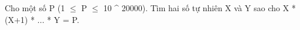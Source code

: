 Cho một số P (1  $\le$  P  $\le$  10 ^ 20000). Tìm hai số tự nhiên X và Y sao cho X * (X+1) * ... * Y = P.  

\